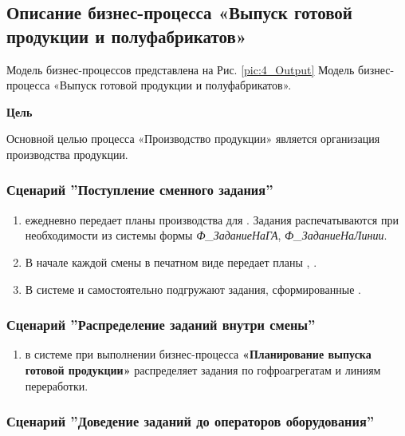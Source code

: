 \newpage
\subsection{Описание бизнес-процесса «Выпуск готовой продукции и полуфабрикатов»}
\label{bp:production}

Модель бизнес-процессов представлена на Рис. \ref{pic:4_Output} Модель бизнес-процесса «Выпуск готовой продукции и полуфабрикатов».

\textbf{Цель}

Основной целью процесса «Производство продукции» является организация производства продукции.

\subsubsection{Сценарий ''Поступление сменного задания''}
\label{bp:production_1}

\begin{enumerate}

\item 	\planner ежедневно  передает планы производства для \master. Задания распечатываются при необходимости из системы \gofro формы \textit{Ф\_ЗаданиеНаГА}, \textit{Ф\_ЗаданиеНаЛинии}.
\item  В начале каждой смены \master в печатном виде передает планы \operator, \gaoperator. 
\item В системе \gofro \operator и \gaoperator самостоятельно подгружают задания, сформированные \planner.
\end{enumerate}


\subsubsection{Сценарий ''Распределение заданий внутри смены''}
\label{bp:production_2}

\begin{enumerate}

\item 	\planner  в системе \gofro при выполнении бизнес-процесса \textbf{«Планирование выпуска готовой продукции»} распределяет задания по гофроагрегатам и линиям переработки.
\end{enumerate}



\subsubsection{Сценарий ''Доведение заданий до операторов оборудования''}
\label{bp:production_3}

